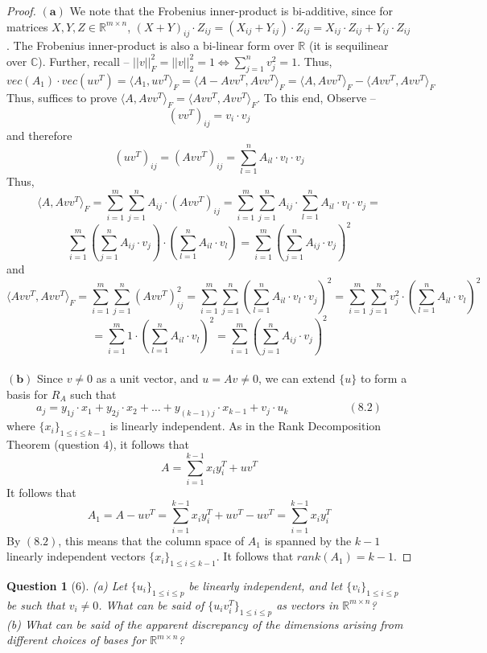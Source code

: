 \documentclass[11pt]{article}
\theoremstyle{quest}
\newtheorem*{question}{Question}
\begin{document}
\begin{proof}
$\mathbf{(a)}$ We note that the Frobenius inner-product is bi-additive, since for matrices $X, Y, Z \in \mathbb{R}^{m \times n}$, $(X+Y)_{ij} \cdot Z_{ij} = (X_{ij} + Y_{ij}) \cdot Z_{ij} = X_{ij} \cdot Z_{ij} + Y_{ij} \cdot Z_{ij}$. The Frobenius inner-product is also a bi-linear form over $\mathbb{R}$ (it is sequilinear over $\mathbb{C}$). Further, recall -- $||v||_F^2 = ||v||_2^2 = 1 \iff \sum_{j=1}^n v_j^2 = 1$. Thus,
$$vec(A_1) \cdot vec(uv^T) = \langle A_1, uv^T \rangle_F = \langle A - Avv^T, Avv^T \rangle_F = \langle A, Avv^T \rangle_F - \langle Avv^T, Avv^T \rangle_F$$
Thus, suffices to prove $ \langle A, Avv^T \rangle_F = \langle Avv^T, Avv^T \rangle_F$. To this end, Observe --
$$(vv^T)_{ij} = v_i \cdot v_j$$
and therefore
$$(uv^T)_{ij} = (Avv^T)_{ij} = \sum_{l=1}^n A_{il} \cdot v_l \cdot v_j$$
Thus,
$$\langle A, Avv^T \rangle_F = \sum_{i =1}^m \sum_{j=1}^n A_{ij} \cdot (Avv^T)_{ij} = \sum_{i =1}^m \sum_{j=1}^n A_{ij} \cdot \sum_{l=1}^n A_{il} \cdot v_l \cdot v_j =$$ $$\sum_{i =1}^m (\sum_{j=1}^n A_{ij} \cdot v_j) \cdot (\sum_{l=1}^n A_{il} \cdot v_l) = \sum_{i =1}^m (\sum_{j=1}^n A_{ij} \cdot v_j)^2$$
and
$$\langle Avv^T, Avv^T \rangle_F = \sum_{i =1}^m \sum_{j =1}^n (Avv^T)_{ij}^2 = \sum_{i =1}^m \sum_{j =1}^n (\sum_{l=1}^n A_{il} \cdot v_l \cdot v_j)^2 = \sum_{i =1}^m \sum_{j =1}^n v_j^2 \cdot (\sum_{l=1}^n A_{il} \cdot v_l)^2$$
$$= \sum_{i =1}^m 1 \cdot (\sum_{l=1}^n A_{il} \cdot v_l)^2 = \sum_{i =1}^m (\sum_{j=1}^n A_{ij} \cdot v_j)^2$$
\\$\mathbf{(b)}$ Since $v \ne 0$ as a unit vector, and $u = Av \ne 0$, we can extend $\{u\}$ to form a basis for $R_A$ such that
$$a_j = y_{1j} \cdot x_1 + y_{2j} \cdot x_2 + \ldots + y_{(k-1)j} \cdot x_{k-1} + v_j \cdot u_k\ \ \ \ \ \ \ \ \ \ \ \ \ \ \ \ \ \ \ \ \ \ \ \ (8.2)$$
where $\{x_i\}_{1 \le i \le k-1}$ is linearly independent. As in the Rank Decomposition Theorem (question $4$), it follows that
$$A = \sum_{i=1}^{k-1} x_i y_i^T + uv^T$$
It follows that
$$A_1 = A - uv^T = \sum_{i=1}^{k-1} x_i y_i^T + uv^T - uv^T = \sum_{i=1}^{k-1} x_i y_i^T$$
By $(8.2)$, this means that the column space of $A_1$ is spanned by the $k-1$ linearly independent vectors $\{x_i\}_{1 \le i \le k-1}$. It follows that $rank(A_1) = k-1$.
\end{proof}
\begin{question}[6]
(a) Let $\{u_i\}_{1 \le i \le p}$ be linearly independent, and let $\{v_i\}_{1 \le i \le p}$ be such that $v_i \ne 0$. What can be said of $\{u_iv_i^T\}_{1 \le i \le p}$ as vectors in $\mathbb{R}^{m \times n}$?
\\(b) What can be said of the apparent discrepancy of the dimensions arising from different choices of bases for $\mathbb{R}^{m \times n}$?
\end{question}
\end{document}
